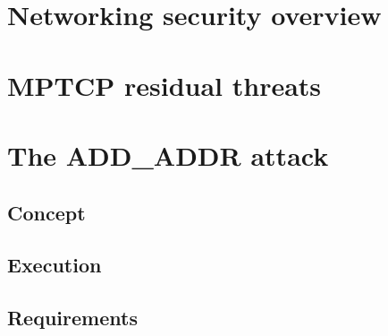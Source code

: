 \section{Networking security overview}
\section{MPTCP residual threats}
\section{The ADD\_ADDR attack} \label{theaddaddrattack}
\subsection{Concept}
\subsection{Execution}
\subsection{Requirements}


